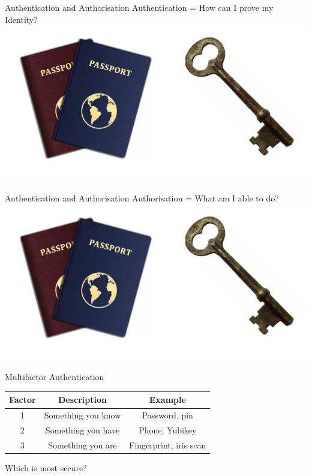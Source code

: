 \documentclass{beamer}
\begin{document}
\begin{frame}{Authentication and Authorisation}
Authentication = How can I prove my Identity?
\includegraphics[width=1\linewidth]{authn-authz.png}
\end{frame}

\begin{frame}{Authentication and Authorisation}
Authorisation = What am I able to do?
\includegraphics[width=1\linewidth]{authn-authz.png}
\end{frame}
\begin{frame}{Multifactor Authentication}
\begin{center}
\begin{tabular}{ |c|c|c| }
\hline
 \textbf{Factor} & \textbf{Description} & \textbf{Example}\\
\hline \hline
 1 & Something you know & Password, pin\\ \hline
 2 & Something you have & Phone, Yubikey \\  \hline
 3 & Something you are & Fingerprint, iris scan \\ \hline
\end{tabular}
\end{center}
Which is most secure?
\end{frame}
\end{document}
